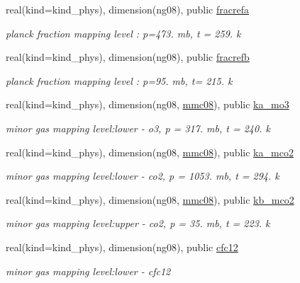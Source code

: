 \begin{Indent}
\begin{DoxyCompactItemize}
real(kind=kind\+\_\+phys), dimension(ng08), public \hyperlink{group__module__radlw__kgbnn_gad1a59ffb362cd72537df9c1916c07621}{fracrefa}
\begin{DoxyCompactList}\small\item\em planck fraction mapping level \+: p=473. mb, t = 259. k \end{DoxyCompactList}\item 
real(kind=kind\+\_\+phys), dimension(ng08), public \hyperlink{group__module__radlw__kgbnn_ga0ae7e4c01034a2b95c03b041537b962e}{fracrefb}
\begin{DoxyCompactList}\small\item\em planck fraction mapping level \+: p=95. mb, t= 215. k \end{DoxyCompactList}\item 
real(kind=kind\+\_\+phys), dimension(ng08, \hyperlink{group__module__radlw__kgbnn_ga9e3bfc1880221c18fa07817eb62bcc47}{mmc08}), public \hyperlink{group__module__radlw__kgbnn_ga7dec65e880c278f44419c1ae01490eae}{ka\+\_\+mo3}
\begin{DoxyCompactList}\small\item\em minor gas mapping level\+:lower -\/ o3, p = 317. mb, t = 240. k \end{DoxyCompactList}\item 
real(kind=kind\+\_\+phys), dimension(ng08, \hyperlink{group__module__radlw__kgbnn_ga9e3bfc1880221c18fa07817eb62bcc47}{mmc08}), public \hyperlink{group__module__radlw__kgbnn_ga0fcd13503b3253ec6aab0aa52056f634}{ka\+\_\+mco2}
\begin{DoxyCompactList}\small\item\em minor gas mapping level\+:lower -\/ co2, p = 1053. mb, t = 294. k \end{DoxyCompactList}\item 
real(kind=kind\+\_\+phys), dimension(ng08, \hyperlink{group__module__radlw__kgbnn_ga9e3bfc1880221c18fa07817eb62bcc47}{mmc08}), public \hyperlink{group__module__radlw__kgbnn_ga9a85770aee1b88b9323d9466c1772ec4}{kb\+\_\+mco2}
\begin{DoxyCompactList}\small\item\em minor gas mapping level\+:upper -\/ co2, p = 35. mb, t = 223. k \end{DoxyCompactList}\item 
real(kind=kind\+\_\+phys), dimension(ng08), public \hyperlink{group__module__radlw__kgbnn_ga010239f14788bc1ed9953133e30a62fd}{cfc12}
\begin{DoxyCompactList}\small\item\em minor gas mapping level\+:lower -\/ cfc12 \end{DoxyCompactList}\item 

\end{DoxyCompactItemize}
\end{Indent}

